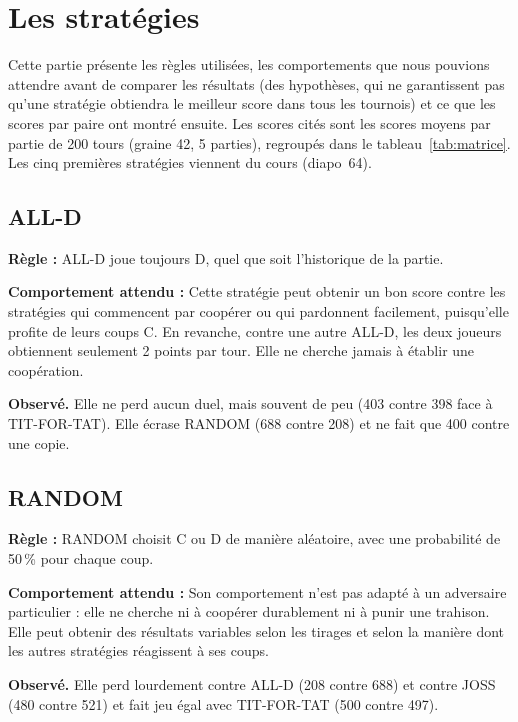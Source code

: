 \documentclass[10pt,a4paper]{article}
\begin{document}
\section{Les stratégies}
Cette partie présente les règles utilisées, les comportements que nous pouvions attendre avant de comparer les résultats (des
hypothèses, qui ne garantissent pas qu'une stratégie obtiendra le meilleur score dans tous les tournois) et ce que les scores
par paire ont montré ensuite. Les scores cités sont les scores moyens par partie de 200 tours (graine 42, 5 parties), regroupés
dans le tableau~\ref{tab:matrice}. Les cinq premières stratégies viennent du cours (diapo~64).

\subsection{ALL-D}
\textbf{Règle :} ALL-D joue toujours D, quel que soit l'historique de la partie.

\textbf{Comportement attendu :} Cette stratégie peut obtenir un bon score contre les stratégies qui commencent par coopérer ou
qui pardonnent facilement, puisqu'elle profite de leurs coups C. En revanche, contre une autre ALL-D, les deux joueurs
obtiennent seulement 2 points par tour. Elle ne cherche jamais à établir une coopération.

\textbf{Observé.} Elle ne perd aucun duel, mais souvent de peu (403 contre 398 face à TIT-FOR-TAT). Elle écrase RANDOM (688
contre 208) et ne fait que 400 contre une copie.

\subsection{RANDOM}
\textbf{Règle :} RANDOM choisit C ou D de manière aléatoire, avec une probabilité de 50\,\% pour chaque coup.

\textbf{Comportement attendu :} Son comportement n'est pas adapté à un adversaire particulier : elle ne cherche ni à coopérer
durablement ni à punir une trahison. Elle peut obtenir des résultats variables selon les tirages et selon la manière dont les
autres stratégies réagissent à ses coups.

\textbf{Observé.} Elle perd lourdement contre ALL-D (208 contre 688) et contre JOSS (480 contre 521) et fait jeu égal avec
TIT-FOR-TAT (500 contre 497).
\end{document}

